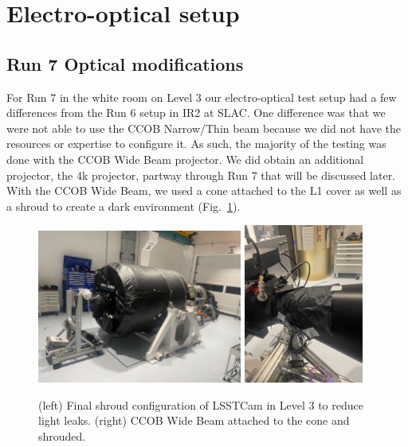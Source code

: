 
\section{Electro-optical setup}\label{electro-optical-setup}

\subsection{Run 7 Optical modifications}\label{run-7-optical-modifications}

For Run 7 in the white room on Level 3 our electro-optical test setup had a few differences from the Run 6 setup in IR2 at SLAC. One difference was that we were not able to use the CCOB Narrow/Thin beam because we did not have the resources or expertise to configure it. As
such, the majority of the testing was done with the CCOB Wide Beam
projector. We did obtain an additional projector, the 4k projector, partway through Run 7 that will be discussed later. With the CCOB Wide Beam,
we used a cone attached to the L1 cover as well as a shroud to create a
dark environment (Fig.~\ref{fig:LSSTCam_config}).

\begin{figure}[htbp]
\centering
    \includegraphics[width=0.6\textwidth]{figures/Camera_Shroud.jpg} 
    \includegraphics[width=0.35\textwidth]{figures/CCOB_Wide_Shroud.jpg} \\
\caption{(left) Final shroud configuration of LSSTCam in Level 3 to reduce light leaks. (right) CCOB Wide Beam attached to the cone and shrouded.}
\label{fig:LSSTCam_config}
\end{figure}

